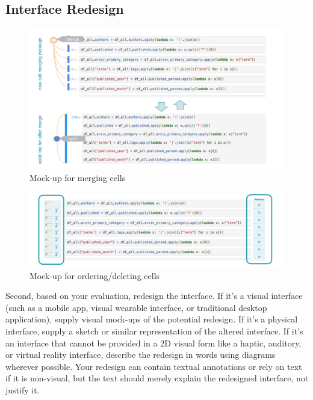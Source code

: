 \documentclass[12pt,letterpaper]{article}
\begin{document}
\subsection*{Interface Redesign}

\begin{figure}[h]
\centering
\includegraphics[scale=.6]{figures/project-principles/cell_merge.png}
\caption{Mock-up for merging cells}
\label{fig::4}
\end{figure}

\begin{figure}[h]
\centering
\includegraphics[scale=.6]{figures/project-principles/cell_create.png}
\caption{Mock-up for ordering/deleting cells}
\label{fig::5}
\end{figure}

Second, based on your evaluation, redesign the interface. If it’s a visual interface (such as a mobile app, visual wearable interface, or traditional desktop application), supply visual mock-ups of the potential redesign. If it’s a physical interface, supply a sketch or similar representation of the altered interface. If it’s an interface that cannot be provided in a 2D visual form like a haptic, auditory, or virtual reality interface, describe the redesign in words using diagrams wherever possible. Your redesign can contain textual annotations or rely on text if it is non-visual, but the text should merely explain the redesigned interface, not justify it.
\end{document}
